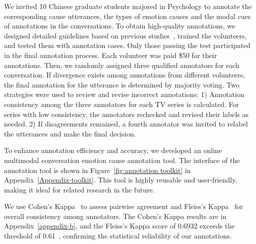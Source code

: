 \documentclass[11pt]{article}
\begin{document}
We invited 10 Chinese graduate students majored in Psychology to annotate the corresponding cause utterances, the types of emotion causes and the modal cues of annotations in the conversations. 
To obtain high-quality annotations, we designed detailed guidelines based on previous studies~\cite{dirven1997emotions, steptoe2009emotional}, trained the volunteers, and tested them with annotation cases.
Only those passing the test participated in the final annotation process.
Each volunteer was paid \$50 for their annotations.
Then, we randomly assigned three qualified annotators for each conversation.
If divergence exists among annotations from different volunteers, the final annotation for the utterance is determined by majority voting.
Two strategies were used to review and revise incorrect annotations:
1) Annotation consistency among the three annotators for each TV series is calculated.
For series with low consistency, the annotators rechecked and revised their labels as needed.
2) If disagreements remained, a fourth annotator was invited to relabel the utterances and make the final decision.

To enhance annotation efficiency and accuracy, we developed an online multimodal conversation emotion cause annotation tool.
The interface of the annotation tool is shown in Figure~\ref{fig:annotation toolkit} in Appendix~\ref{Appendix-toolkit}.
This tool is highly reusable and user-friendly, making it ideal for related research in the future.

We use Cohen’s Kappa~\cite{cohens-kappa} to assess pairwise agreement and Fleiss’s Kappa~\cite{fless-kappa} for overall consistency among annotators.
The Cohen’s Kappa results are in Appendix~\ref{appendix-b}, and the Fleiss’s Kappa score of 0.6932 exceeds the threshold of 0.61~\cite{landis1977measurement}, confirming the statistical reliability of our annotations.
\end{document}
